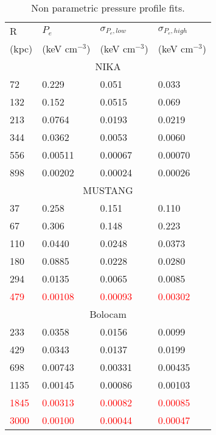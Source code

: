 \begin{table}  %
  \caption{\footnotesize{Non parametric pressure profile fits.}}
  \begin{center}
    \begin{tabular}{|l|lll|}
      \hline
      R     & $P_e$          & $\sigma_{P_e,low}$ & $\sigma_{P_e,high}$ \\
      (kpc) & (keV cm$^{-3}$) & (keV cm$^{-3}$)   & (keV cm$^{-3}$)   \\
      \hline
      \multicolumn{4}{|c|}{NIKA} \\
      \hline
      72  &  0.229 & 0.051  & 0.033       \\
      132 &  0.152 &  0.0515  & 0.069      \\
      213 &  0.0764 &  0.0193  & 0.0219    \\
      344 &  0.0362 &  0.0053  & 0.0060    \\
      556 &  0.00511 &  0.00067  & 0.00070  \\
      898 &  0.00202 &  0.00024  & 0.00026  \\
      \hline
      
      \multicolumn{4}{|c|}{MUSTANG} \\
      \hline
      37  & 0.258 &  0.151  & 0.110       \\
      67  & 0.306 &  0.148  & 0.223       \\
      110 & 0.0440 &  0.0248  & 0.0373     \\
      180 & 0.0885 &  0.0228  & 0.0280     \\
      294 & 0.0135 &  0.0065  & 0.0085     \\
      \textcolor{red}{479} & \textcolor{red}{0.00108} &
      \textcolor{red}{0.00093}  & \textcolor{red}{0.00302}  \\
      \hline
      
      \multicolumn{4}{|c|}{Bolocam} \\
      \hline
      233  & 0.0358 & 0.0156  & 0.0099     \\
      429  & 0.0343 & 0.0137  & 0.0199     \\
      698  & 0.00743 & 0.00331  & 0.00435  \\
      1135 & 0.00145 & 0.00086  & 0.00103  \\
      \textcolor{red}{1845} & \textcolor{red}{0.00313} &
      \textcolor{red}{0.00082}  & \textcolor{red}{0.00085}  \\
      \textcolor{red}{3000} & \textcolor{red}{0.00100} &
      \textcolor{red}{0.00044}  &
      \textcolor{red}{0.00047}  \\
      \hline
    \end{tabular}
  \end{center}
  \label{tbl:nppp_res}
\end{table}


